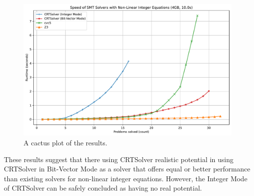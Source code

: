 
\begin{figure}
    \vspace{4em}
    \centering
    \includegraphics[width=1.0\linewidth]{cactus.pdf}
  \caption{A cactus plot of the results.}
  \label{figure:cactus-plot}
\end{figure}

These results suggest that there using CRTSolver realistic potential in using CRTSolver in Bit-Vector Mode
as a solver that offers equal or better performance than existing solvers for non-linear
integer equations. However, the Integer Mode of CRTSolver can be safely concluded as having no real potential.
